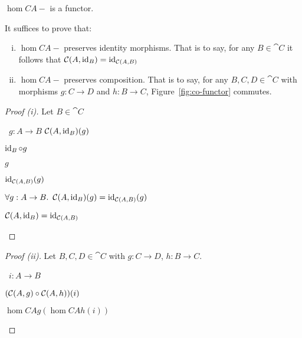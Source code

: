 \begin{prop}
  $\hom{C}{A}{-}$ is a functor.

  It suffices to prove that:
  \begin{enumerate}[(i)]
    \item $\hom{C}{A}{-}$ preserves identity morphisms. That is to say, for any $B\in\cat{C}$ it follows that $\mathcal{C}(A, \operatorname{id}_B) = \operatorname{id}_{\mathcal{C}(A, B)}$
    \item $\hom{C}{A}{-}$ preserves composition. That is to say, for any $B,C,D\in\cat{C}$ with morphisms $g : C \to D$
      and $h : B \to C$, Figure~\ref{fig:co-functor} commutes.
  \end{enumerate}
  \begin{proof}[Proof (i)]
    Let $B\in\cat{C}$
    \begin{itemize}
      \step
        \begin{itemize}
          \subp{\star}
            \Let~$g : A \to B$
            \marginnote{\Hyp}
          \step
            $\mathcal{C}(A, \operatorname{id}_B)(g)$

          \step[=]
            $\operatorname{id}_B\circ g$
            \marginnote{\Def-\ref{def:co-hom}}

          \step[=]
            $g$
            \marginnote{\Def-$\id$}

          \step[=]
            $\operatorname{id}_{\mathcal{C}(A, B)}(g)$
            \marginnote{\Def-$\id$}
        \end{itemize}

      \step[\imps]
        $\forall g : A \to B\ldotp~\mathcal{C}(A, \operatorname{id}_B)(g) = \operatorname{id}_{\mathcal{C}(A, B)}(g)$
        \marginnote{$\forall$-\Intro}

      \step[\iffs]
        $\mathcal{C}(A, \operatorname{id}_B) = \operatorname{id}_{\mathcal{C}(A, B)}$
        \marginnote{\Def-=}
        \qedhere
    \end{itemize}
  \end{proof}

  \begin{proof}[Proof (ii)]
    Let $B, C, D\in\cat{C}$ with ${g : C\to D}$, ${h : B\to C}$.
    \begin{itemize}
      \step
        \begin{itemize}
          \subp{\star} \Let~$i : A\to B$
            \marginnote{\Hyp}

          \step
            $(\mathcal{C}(A, g)\circ\mathcal{C}(A, h))(i)$

          \step[=] $\hom{C}{A}{g}(\hom{C}{A}{h}(i))$
            \marginnote{\Def-$\compose$}


\end{itemize}
\end{itemize}
\end{proof}
\end{prop}
